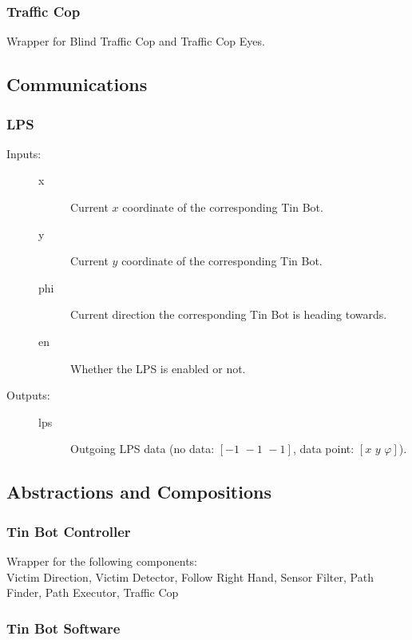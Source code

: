 \documentclass[a4paper,parskip,headheight=38pt]{scrartcl} %
\begin{document}
\subsubsection{Traffic Cop}

Wrapper for Blind Traffic Cop and Traffic Cop Eyes.

\subsection{Communications}

\subsubsection{LPS}
\begin{description}
\item[Inputs:] \hfill
	\begin{description}
	\item[x] Current $x$ coordinate of the corresponding Tin Bot.
	\item[y] Current $y$ coordinate of the corresponding Tin Bot.
	\item[phi] Current direction the corresponding Tin Bot is heading towards.
	\item[en] Whether the LPS is enabled or not.
	\end{description}
\item[Outputs:] \hfill
	\begin{description}
	\item[lps] Outgoing LPS data  (no data: $[-1\,\, -1\,\, -1]$, data point: $[x\,\, y\,\, \varphi]$).
	\end{description}
\end{description}



\subsection{Abstractions and Compositions}
\subsubsection{Tin Bot Controller}

Wrapper for the following components: \\
Victim Direction, Victim Detector, Follow Right Hand, Sensor Filter, Path Finder, Path Executor, Traffic Cop

\subsubsection{Tin Bot Software}
\end{document}
